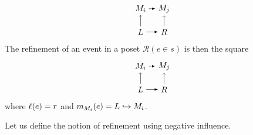 \begin{definition}
\begin{itemize}
\[    \begin{tikzpicture} %
      \node (mi) at (-2,1) {\(M_i\)};
      \node (mj) at (-1,1) {\(M_j\)};
      \node (r1) at (-1,0) {\(R\)};
      \node (l1) at (-2,0) {\(L\)};
      \draw [->] (l1) -- (mi);
      \draw [->] (r1) -- (mj);
      \draw [>=latex, ->] (mi) -- (mj);
      \draw [>=latex, ->] (l1) -- (r1);
    \end{tikzpicture}
    \]
    The refinement of an event in a poset $\mathcal{R}(e\in s)$ is then the square
    \[
    \begin{tikzpicture} %
      \node (mi) at (-2,1) {\(M_i\)};
      \node (mj) at (-1,1) {\(M_j\)};
      \node (r1) at (-1,0) {\(R\)};
      \node (l1) at (-2,0) {\(L\)};
      \draw [->] (l1) -- (mi);
      \draw [->] (r1) -- (mj);
      \draw [>=latex, ->] (mi) -- (mj);
      \draw [>=latex, ->] (l1) -- (r1);
    \end{tikzpicture}
    \]
    where $\ell(e) = r$ and $m_{M_i}(e) = L \hookrightarrow M_i$.
  \end{itemize}
\end{definition}

Let us define the notion of refinement using negative influence.

